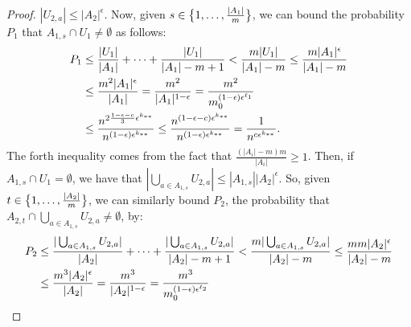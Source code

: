 \begin{lemma}
\begin{proof}
                $|U_{2,a}| \leq |A_2|^\epsilon$.
                Now, given $s \in \bigl\{ 1, \dots, \frac{|A_1|}{m} \bigr\}$, we can bound the probability $P_1$ that
                $A_{1,s} \cap U_1 \neq \emptyset$ as follows:
                \[
                    \begin{split}
                        P_1
                            & \leq \frac{|U_1|}{|A_1|} + \dots + \frac{|U_1|}{|A_1|-m+1}
                                < \frac{m |U_1|}{|A_1| - m}
                                \leq \frac{m |A_1|^\epsilon}{|A_1| - m} \\
                            & \leq \frac{m^2 |A_1|^\epsilon}{|A_1|}
                                = \frac{m^2}{|A_1|^{1-\epsilon}}
                                = \frac{m^2}{m_0^{\parround{1-\epsilon} \epsilon^{\ell_1}}} \\ %
                            & \leq \frac{n^{2\frac{1-\epsilon-c}{3} \epsilon^{k_{**}}}}{n^{(1-\epsilon)\epsilon^{k_{**}}}}
                                \leq \frac{n^{(1-\epsilon-c) \epsilon^{k_{**}}}}{n^{(1-\epsilon)\epsilon^{k_{**}}}}
                                = \frac{1}{n^{c \epsilon^{k_{**}}}}.
                    \end{split}
                \]
                The forth inequality comes from the fact that $\frac{(|A_i| - m) m}{|A_i|} \geq 1$.
                Then, if $A_{1,s} \cap U_1= \emptyset$, we have that $|\bigcup_{a \in A_{1,s}} U_{2,a}| \leq |A_{1,s}| |A_2|^\epsilon$.
                So, given $t \in \bigl\{ 1, \dots, \frac{|A_2|}{m} \bigr\}$, we can similarly bound $P_2$, the probability that
                $A_{2,t} \cap \bigcup_{a \in A_{1,s}} U_{2,a} \neq \emptyset$, by:
                \[
                    \begin{split}
                        P_2
                            & \leq \frac{|\bigcup_{a \in A_{1,s}} U_{2,a}|}{|A_2|} + \dots + \frac{|\bigcup_{a \in A_{1,s}} U_{2,a}|}{|A_2|-m+1}
                                < \frac{m |\bigcup_{a \in A_{1,s}} U_{2,a}|}{|A_2| - m}
                                \leq \frac{m m |A_2|^\epsilon}{|A_2| - m} \\
                            & \leq \frac{m^3 |A_2|^\epsilon}{|A_2|}
                                = \frac{m^3}{|A_2|^{1-\epsilon}}
                                = \frac{m^3}{m_0^{\parround{1-\epsilon} \epsilon^{\ell_2}}} \\ %

\end{split}\]
\end{proof}
\end{lemma}
